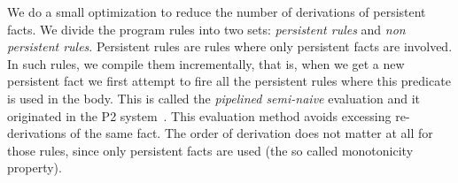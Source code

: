 We do a small optimization to reduce the number of derivations of persistent facts. We
divide the program rules into two sets: \emph{persistent rules} and \emph{non persistent rules}.
Persistent rules are rules where only persistent facts are involved. In such rules, we compile
them incrementally, that is, when we get a new persistent fact we first attempt to fire
all the persistent rules where this predicate is used in the body. This is called
the \emph{pipelined semi-naive} evaluation and it originated in the P2 system~\cite{Loo-condie-garofalakis-p2}. This evaluation method avoids excessing re-derivations
of the same fact. The order of derivation does not matter at all for those rules, since
only persistent facts are used (the so called monotonicity property).